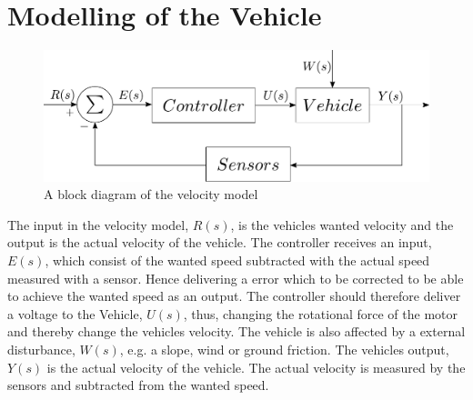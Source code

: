 \chapter{Modelling of the Vehicle}\label{cha:ModelOfVehicle}

\begin{figure}[H]
	\centering
	\includegraphics[scale=0.6]{figures/StartTotalModelsystem.pdf}
	\caption{A block diagram of the velocity model}
	\label{fig:StartTotalModelsystem}
\end{figure}

The input in the velocity model, $R(s)$, is the vehicles wanted velocity and the output is the actual velocity of the vehicle. The controller receives an input, $E(s)$, which consist of the wanted speed subtracted with the actual speed measured with a sensor. Hence delivering a error which to be corrected to be able to achieve the wanted speed as an output. The controller should therefore deliver a voltage to the Vehicle, $U(s)$, thus, changing the rotational force of the motor and thereby change the vehicles velocity. The vehicle is also affected by a external disturbance, $W(s)$, e.g. a slope, wind or ground friction. The vehicles output, $Y(s)$ is the actual velocity of the vehicle. The actual velocity is measured by the sensors and subtracted from the wanted speed.